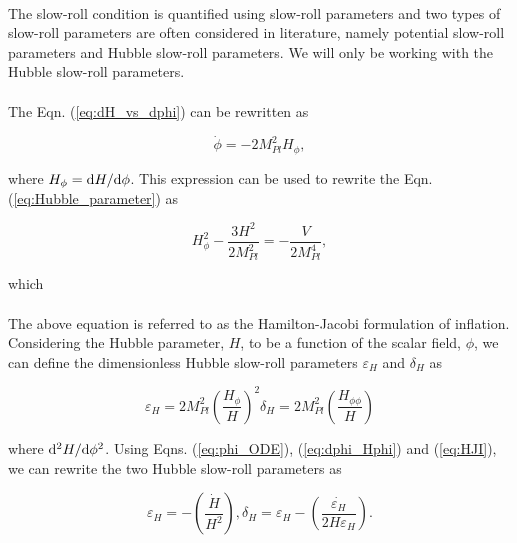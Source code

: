 \documentclass[12pt,a4paper,oneside]{book}
\begin{document}
\paragraph*{} The slow-roll condition is quantified using slow-roll parameters and 
two types of slow-roll parameters are often considered in literature, namely 
potential slow-roll parameters and Hubble slow-roll parameters. We will only be 
working with the Hubble slow-roll parameters.

\paragraph*{} The Eqn. (\ref{eq:dH_vs_dphi}) can be rewritten as 

\begin{equation}\label{eq:dphi_Hphi}
\dot{\phi} = -2M_{Pl}^2H_{\phi},
\end{equation}

\noindent where $H_{\phi} = {\rm d}H/{\rm d}\phi$. This expression can be used to rewrite 
the Eqn. (\ref{eq:Hubble_parameter}) as 

\begin{equation}\label{eq:HJI}
H_{\phi}^2 - \frac{3H^2}{2M_{Pl}^2} = -\frac{V}{2M_{Pl}^4},
\end{equation}

\noindent which 

\paragraph*{} The above equation is referred to as the Hamilton-Jacobi formulation of inflation. 
Considering the Hubble parameter, $H$, to be a function of the scalar field, $\phi$, we can 
define the dimensionless Hubble slow-roll parameters $\varepsilon_H$ and $\delta_H$ as 

\begin{equation}
\varepsilon_H = 2M_{Pl}^2\left(\frac{H_{\phi}}{H}\right)^2
\delta_H = 2M_{Pl}^2\left(\frac{H_{\phi\phi}}{H}\right)
\end{equation}

\noindent where ${\rm d}^2H/{\rm d}\phi^2$. Using Eqns. (\ref{eq:phi_ODE}), (\ref{eq:dphi_Hphi})
 and (\ref{eq:HJI}), we can rewrite the two Hubble slow-roll parameters as 
 
 \begin{equation}
 \varepsilon_H = -\left(\frac{\dot{H}}{H^2}\right),
 \delta_H = \varepsilon_H - \left(\frac{\dot{\varepsilon_H}}{2H\varepsilon_H}\right).
 \end{equation}
\end{document}
